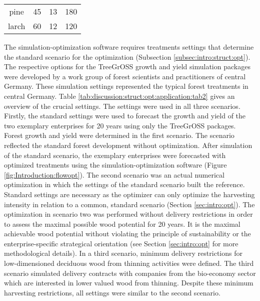 \begin{table}[h]
\begin{tabular}{cccc}
		pine        & 45                                                                 & 13                                                                                  & 180                                                                                \\
		larch        & 60                                                                 & 12                                                                                  & 120                                                                                \\ \hline
	\end{tabular}
\end{table}

The si\-mu\-la\-tion-op\-ti\-mi\-za\-tion software requires treatments settings that determine the standard scenario for the optimization (Subsection \ref{subsec:intro:struct:opt}). The respective options for the TreeGrOSS growth and yield simulation packages were developed by a work group of forest scientists and practitioners of central Germany. These simulation settings represented the typical forest treatments in central Germany. Table \ref{tab:discussion:struct:opt:application:tab2} gives an overview of the crucial settings. The settings were used in all three scenarios. Firstly, the standard settings were used to forecast the growth and yield of the two exemplary enterprises for 20 years using only the TreeGrOSS packages. Forest growth and yield were determined in the first scenario. The scenario reflected the standard forest development without optimization. After simulation of the standard scenario, the exemplary enterprises were forecasted with optimized treatments using the si\-mu\-la\-tion-op\-ti\-mi\-za\-tion software (Figure \ref{fig:Introduction:flowopt}). The second scenario was an actual numerical optimization in which the settings of the standard scenario built the reference. Standard settings are necessary as the optimizer can only optimize the harvesting intensity in relation to a common, standard scenario (Section \ref{sec:intro:opt}). The optimization in scenario two was performed without delivery restrictions in order to assess the maximal possible wood potential for 20 years. It is the maximal achievable wood potential without violating the principle of sustainability or the enterprise-specific strategical orientation (see Section \ref{sec:intro:opt} for more methodological details). In a third scenario, minimum delivery restrictions for low-dimensioned deciduous wood from thinning activities were defined. The third scenario simulated delivery contracts with companies from the bio-economy sector which are interested in lower valued wood from thinning. Despite these minimum harvesting restrictions, all settings were similar to the second scenario.

